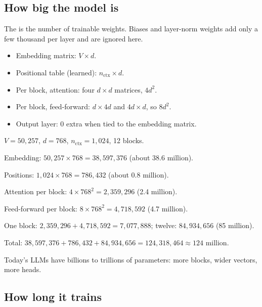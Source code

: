 \subsection*{How big the model is}

\begin{definition}
The  is the number of trainable weights. Biases and layer-norm weights add only a few thousand per layer and are ignored here.
\begin{itemize}
  \item Embedding matrix: $V \times d$.
  \item Positional table (learned): $n_{\text{ctx}} \times d$.
  \item Per block, attention: four $d \times d$ matrices, $4d^2$.
  \item Per block, feed-forward: $d \times 4d$ and $4d \times d$, so $8d^2$.
  \item Output layer: 0 extra when tied to the embedding matrix.
\end{itemize}
\end{definition}

\begin{example}
$V = 50{,}257$, $d = 768$, $n_{\text{ctx}} = 1{,}024$, 12 blocks.
\begin{steps}
  \item Embedding: $50{,}257 \times 768 = 38{,}597{,}376$ (about 38.6 million).
  \item Positions: $1{,}024 \times 768 = 786{,}432$ (about 0.8 million).
  \item Attention per block: $4 \times 768^2 = 2{,}359{,}296$ (2.4 million).
  \item Feed-forward per block: $8 \times 768^2 = 4{,}718{,}592$ (4.7 million).
  \item One block: $2{,}359{,}296 + 4{,}718{,}592 = 7{,}077{,}888$; twelve: $84{,}934{,}656$ (85 million).
  \item Total: $38{,}597{,}376 + 786{,}432 + 84{,}934{,}656 = 124{,}318{,}464 \approx 124$ million.
\end{steps}
Today's LLMs have billions to trillions of parameters: more blocks, wider vectors, more heads.
\end{example}

\subsection*{How long it trains}

